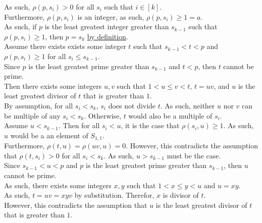 \documentclass[a4paper,12pt]{article}
\begin{document}
\noindent As such, $\rho(p, s_i) > 0$ for all $s_i$ such that $i \in [k]$.\\

\noindent Furthermore, $\rho(p, s_i)$ is an integer, as such, $\rho(p, s_i) \geq 1 = a$.\\

\noindent As such, if $p$ is the least greatest integer greater than $s_{k - 1}$ such that $\rho(p, s_i) \geq 1$, then $p = s_k$ \hyperlink{definition:awkward_number_series}{by definition}.\\

\noindent Assume there exists exists some integer $t$ such that $s_{k - 1} < t < p$ and $\rho(p, s_i) \geq 1$ for all $s_i \leq s_{k - 1}$.\\

\noindent Since $p$ is the least greatest prime greater than $s_{k - 1}$ and $t < p$, then $t$ cannot be prime.\\

\noindent Then there exists some integers $u, v$ such that $1 < u \leq v < t$, $t = uv$, and $u$ is the least greatest divisor of $t$ that is greater than $1$.\\

\noindent By assumption, for all $s_i < s_k$, $s_i$ does not divide $t$. As such, neither $u$ nor $v$ can be multiple of any $s_i < s_k$. Otherwise, $t$ would also be a multiple of $s_i$.\\

\noindent Assume $u < s_{k - 1}$. Then for all $s_i < u$, it is the case that $\rho(s_i, u) \geq 1$. As such, $u$ would be a an element of $S_{1,1}$.\\

\noindent Furthermore, $\rho(t, u) = \rho(uv, u) = 0$. However, this contradicts the assumption that $\rho(t, s_i) > 0$ for all $s_i < s_k$. As such, $u > s_{k - 1}$ must be the case.\\

\noindent Since $s_{k - 1} < u < p$ and $p$ is the least greatest prime greater than $s_{k - 1}$, then $u$ cannot be prime.\\

\noindent As such, there exists some integers $x, y$ such that $1 < x \leq y < u$ and $u = xy$.\\

\noindent As such, $t = uv = xyv$ by substitution. Therefor, $x$ is divisor of $t$.\\

\noindent However, this contradicts the assumption that $u$ is the least greatest divisor of $t$ that is greater than $1$.\\
\end{document}
